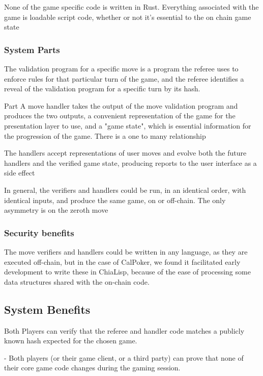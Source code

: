 \documentclass[a4paper]{article}
\begin{document}
\begin{multicols}{2}
None of the game specific code is written in Rust. Everything associated with the game is loadable script code, whether or not it's essential to the on chain game state

\subsubsection{System Parts}

The validation program for a specific move is a program the referee uses to enforce rules for that particular turn of the game, and the referee identifies a reveal of the validation program for a specific turn by its hash.

Part A move handler takes the output of the move validation program and produces the 
two outputs, a convenient representation of the game for the presentation layer to use, and a "game state", which is essential information for the progression of the game. There is a one to many relationship 

The handlers accept representations of user moves and evolve both the future handlers and the verified game state, producing reports to the user interface as a side effect

In general, the verifiers and handlers could be run, in an identical order, with identical inputs, and produce the same game, on or off-chain. The only asymmetry is on the zeroth move 

\subsubsection{Security benefits}

The move verifiers and handlers could be written in any language, as they are executed off-chain, but in the case of CalPoker, we found it facilitated early development to write these in ChiaLisp, because of the ease of processing some data structures shared with the on-chain code.


\subsection
{System Benefits}

Both Players can verify that the referee and handler code matches a publicly known hash expected for the chosen game.


- Both players (or their game client, or a third party) can prove that none of their core game code changes during the gaming session.


\end{multicols}
\end{document}
